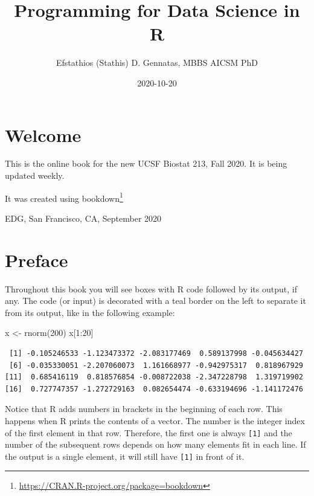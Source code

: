 \documentclass[
]{book}
\title{Programming for Data Science in R}
\author{Efstathios (Stathis) D. Gennatas, MBBS AICSM PhD}
\date{2020-10-20}
\newenvironment{Shaded}{\begin{snugshade}}{\end{snugshade}}
\newcommand{\DecValTok}[1]{\textcolor[rgb]{0.00,0.00,0.81}{#1}}
\newcommand{\FunctionTok}[1]{\textcolor[rgb]{0.00,0.00,0.00}{#1}}
\newcommand{\NormalTok}[1]{#1}
\newcommand{\OtherTok}[1]{\textcolor[rgb]{0.56,0.35,0.01}{#1}}
\newcommand{\SpecialCharTok}[1]{\textcolor[rgb]{0.00,0.00,0.00}{#1}}
\renewcommand{\href}[2]{#2\footnote{\url{#1}}}
\begin{document}
\maketitle

{
\setcounter{tocdepth}{1}
\tableofcontents
}
\hypertarget{welcome}{%
\chapter*{Welcome}\label{welcome}}

This is the online book for the new UCSF Biostat 213, Fall 2020.
It is being updated weekly.

It was created using \href{https://CRAN.R-project.org/package=bookdown}{bookdown} \citep{R-bookdown}

EDG, San Francisco, CA, September 2020

\hypertarget{preface}{%
\chapter*{Preface}\label{preface}}

Throughout this book you will see boxes with R code followed by its output, if any. The code (or input) is decorated with a teal border on the left to separate it from its output, like in the following example:

\begin{Shaded}
\begin{Highlighting}[]
\NormalTok{x }\OtherTok{\textless{}{-}} \FunctionTok{rnorm}\NormalTok{(}\DecValTok{200}\NormalTok{)}
\NormalTok{x[}\DecValTok{1}\SpecialCharTok{:}\DecValTok{20}\NormalTok{]}
\end{Highlighting}
\end{Shaded}

\begin{verbatim}
 [1] -0.105246533 -1.123473372 -2.083177469  0.589137998 -0.045634427
 [6] -0.035330051 -2.207060073  1.161668977 -0.942975317  0.818967929
[11]  0.685416119  0.818576854 -0.008722038 -2.347228798  1.319719902
[16]  0.727747357 -1.272729163  0.082654474 -0.633194696 -1.141172476
\end{verbatim}

Notice that R adds numbers in brackets in the beginning of each row. This happens when R prints the contents of a vector. The number is the integer index of the first element in that row. Therefore, the first one is always \texttt{{[}1{]}} and the number of the subsequent rows depends on how many elements fit in each line. If the output is a single element, it will still have \texttt{{[}1{]}} in front of it.
\end{document}
